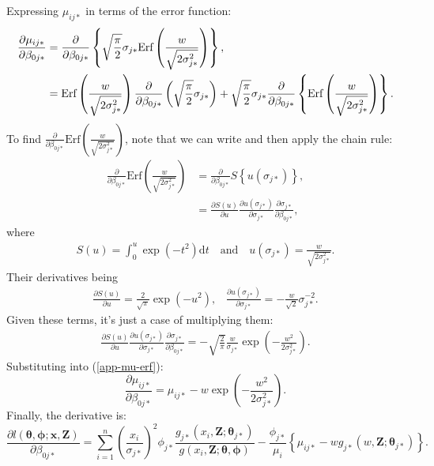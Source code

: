 Expressing $\mu_{ij*}$ in terms of the error function:
\begin{align}
\frac{\partial \mu_{ij*}}{\partial \beta_{0j*}} &= \frac{\partial}{\partial \beta_{0j*}} \left \{ \sqrt{\frac{\pi}{2}} \sigma_{j*} \text{Erf}\left (\frac{w}{\sqrt{2\sigma_{j*}^2}}\right ) \right \} \notag, \\
&= \text{Erf}\left (\frac{w}{\sqrt{2\sigma_{j*}^2}}\right ) \frac{\partial}{\partial \beta_{0j*}} \left ( \sqrt{\frac{\pi}{2}} \sigma_{j*} \right ) + \sqrt{\frac{\pi}{2}} \sigma_{j*} \frac{\partial}{\partial \beta_{0j*}} \left \{ \text{Erf}\left (\frac{w}{\sqrt{2\sigma_{j*}^2}}\right ) \right \}. \label{app-mu-erf}
\end{align}
To find $\frac{\partial}{\partial \beta_{0j*}} \text{Erf}\left (\frac{w}{\sqrt{2\sigma_{j*}^2}}\right )$, note that we can write and then apply the chain rule:
\begin{align*}
\frac{\partial}{\partial \beta_{0j*}} \text{Erf}\left (\frac{w}{\sqrt{2\sigma_{j*}^2}}\right ) &= \frac{\partial}{\partial \beta_{0j*}} S \left \{ u(\sigma_{j*})\right \}, \\
&= \frac{\partial S(u)}{\partial u} \frac{\partial u(\sigma_{j*})}{\partial \sigma_{j*} } \frac{\partial \sigma_{j*}}{\partial \beta_{0j*}},
\end{align*}
where 
\begin{align*}
S(u) = \int_0^{u} \exp \left (-t^2 \right ) \text{d}t \quad \text{and} \quad u(\sigma_{j*})=\frac{w}{\sqrt{2\sigma_{j*}^2}}.
\end{align*}
Their derivatives being
\begin{align*}
\frac{\partial S(u)}{\partial u} = \frac{2}{\sqrt{\pi}} \exp(-u^2) \text{,} \quad \frac{\partial u(\sigma_{j*})}{\partial \sigma_{j*}} = -\frac{w}{\sqrt{2}}\sigma_{j*}^{-2}.
\end{align*}
Given these terms, it's just a case of multiplying them:
\begin{align*}
\frac{\partial S(u)}{\partial u} \frac{\partial u(\sigma_{j*})}{\partial \sigma_{j*} } \frac{\partial \sigma_{j*}}{\partial \beta_{0j*}} = - \sqrt{\frac{2}{\pi}} \frac{w}{\sigma_{j*}} \exp\left ( -\frac{w^2}{2\sigma_{j*}^2} \right ).
\end{align*}
Substituting into (\ref{app-mu-erf}):
\begin{equation*}
\frac{\partial \mu_{ij*}}{\partial \beta_{0j*}} =  \mu_{ij*} - w \exp\left ( -\frac{w^2}{2\sigma_{j*}^2} \right ).
\end{equation*}
Finally, the derivative is:
\begin{equation*}
\frac{\partial l(\bm{\theta}, \bm{\phi}; \mathbf{x},\mathbf{Z})}{\partial \beta_{0j*}} = \sum_{i=1}^n \left ( \frac{x_i}{\sigma_{j*}}\right )^2 \phi_{j*} \frac{g_{j*}(x_i,\mathbf{Z}; \bm{\theta}_{j*})}{g(x_i,\mathbf{Z}; \bm{\theta},\bm{\phi})}  - \frac{\phi_{j*}}{\mu_i} \left \{ \mu_{ij*} - w g_{j*}(w,\mathbf{Z}; \bm{\theta}_{j*}) \right \}.
\end{equation*}



